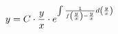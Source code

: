 \documentclass[preview]{standalone}
\begin{document}
\begin{align*}
\special{dvisvgm:raw <g id='unique000'>}y = C \cdot \frac{y}{x} \cdot e^{\int \frac{1}{f\left(\frac{y}{x}\right) - \frac{y}{x}} d\left(\frac{y}{x}\right)}\special{dvisvgm:raw </g>}
\end{align*}
\end{document}
